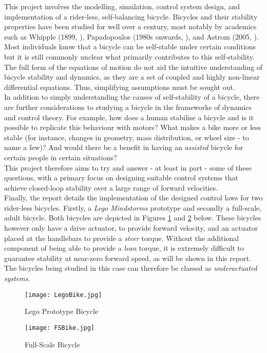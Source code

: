 This project involves the modelling, simulation, control system design, and implementation of a rider-less, self-balancing bicycle. Bicycles and their stability properties have been studied for well over a century, most notably by academics such as Whipple (1899, \cite{whipple}), Papadopoulos (1980s onwards, \cite{papadopoulos}), and Astrom (2005, \cite{astrom}). Most individuals know that a bicycle can be self-stable under certain conditions but it is still commonly unclear what primarily contributes to this self-stability. The full form of the equations of motion do not aid the intuitive understanding of bicycle stability and dynamics, as they are a set of coupled and highly non-linear differential equations. Thus, simplifying assumptions must be sought out. \\

\noindent In addition to simply understanding the causes of self-stability of a bicycle, there are further considerations to studying a bicycle in the frameworks of dynamics and control theory. For example, how does a human stabilise a bicycle and is it possible to replicate this behaviour with motors? What makes a bike more or less stable (for instance, changes in geometry, mass distribution, or wheel size - to name a few)? And would there be a benefit in having an \textit{assisted} bicycle for certain people in certain situations? \\

\noindent This project therefore aims to try and answer - at least in part - some of these questions, with a primary focus on designing suitable control systems that achieve closed-loop stability over a large range of forward velocities. \\

Finally, the report details the implementation of the designed control laws for two rider-less bicycles. Firstly, a \textit{Lego Mindstorms} prototype and secondly a full-scale, adult bicycle. Both bicycles are depicted in Figures \ref{fig:lego} and \ref{fig:fs} below. These bicycles however only have a drive actuator, to provide forward velocity, and an actuator placed at the handlebars to provide a \textit{steer} torque. Without the additional component of being able to provide a \textit{lean} torque, it is extremely difficult to guarantee stability at near-zero forward speed, as will be shown in this report. The bicycles being studied in this case can therefore be classed as \textit{underactuated systems}.

\begin{figure}[H]
\centering
\texttt{[image: LegoBike.jpg]}
\caption{Lego Prototype Bicycle}
\label{fig:lego}
\end{figure}

\begin{figure}[H]
\centering
\texttt{[image: FSBike.jpg]}
\caption{Full-Scale Bicycle}
\label{fig:fs}
\end{figure}